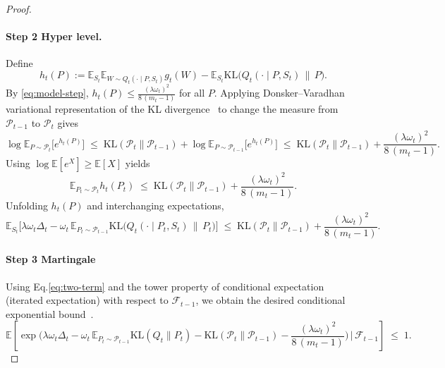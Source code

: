 \documentclass{article}
\theoremstyle{plain}
\theoremstyle{definition}
\theoremstyle{remark}
\begin{document}
\begin{proof}
\paragraph{Step 2 Hyper level.} 
Define
\[
h_t(P):=\mathbb E_{S_t}\mathbb E_{W\sim Q_t(\cdot\mid P,S_t)} g_t(W)
-\mathbb E_{S_t}\mathrm{KL}\!\big(Q_t(\cdot\mid P,S_t)\,\|\,P\big).
\]
By \eqref{eq:model-step}, $h_t(P)\le \frac{(\lambda\omega_t)^2}{8\,(m_t-1)}$ for all $P$.
Applying Donsker–Varadhan variational representation of the KL divergence~\cite{NEURIPS2021_54a367d6} to change the measure from $\mathcal P_{t-1}$ to $\mathcal P_t$ gives
\begin{equation}
\label{eq:dv-p}
\log\mathbb E_{P\sim\mathcal P_t}\!\big[e^{h_t(P)}\big]
\;\le\; \mathrm{KL}(\mathcal P_t\|\mathcal P_{t-1})
+\log\mathbb E_{P\sim\mathcal P_{t-1}}\!\big[e^{h_t(P)}\big]
\;\le\; \mathrm{KL}(\mathcal P_t\|\mathcal P_{t-1})
+\frac{(\lambda\omega_t)^2}{8\,(m_t-1)}.
\end{equation}
Using $\log\mathbb E[e^X]\ge \mathbb E[X]$ yields
\begin{equation}
\label{eq:p-expect}
\mathbb E_{P_t\sim\mathcal P_t} h_t(P_t)
\;\le\; \mathrm{KL}(\mathcal P_t\|\mathcal P_{t-1})
+\frac{(\lambda\omega_t)^2}{8\,(m_t-1)}.
\end{equation}
Unfolding $h_t(P)$ and interchanging expectations,
\begin{equation}
\label{eq:two-term}
\mathbb E_{S_t}\Big[
\lambda\omega_t\Delta_t
-\omega_t\,\mathbb E_{P_t\sim\mathcal P_{t-1}}\mathrm{KL}\!\big(Q_t(\cdot\mid P_t,S_t)\,\|\,P_t\big)
\Big]
\;\le\;
\mathrm{KL}(\mathcal P_t\|\mathcal P_{t-1})
+\frac{(\lambda\omega_t)^2}{8\,(m_t-1)}.
\end{equation}

\paragraph{Step 3 Martingale}







Using Eq.\eqref{eq:two-term} and the tower property of conditional expectation (iterated expectation) with respect to $\mathcal F_{t-1}$, we obtain the desired conditional exponential bound~\cite{yangshuxue}.
\begin{equation}
\label{eq:cond-mgf}
\mathbb E\!\left[
\exp\!\Big(
\lambda\omega_t\Delta_t
-\omega_t\,\mathbb E_{P_t\sim\mathcal P_{t-1}}\mathrm{KL}(Q_t\|P_t)
-\mathrm{KL}(\mathcal P_t\|\mathcal P_{t-1})
-\frac{(\lambda\omega_t)^2}{8\,(m_t-1)}
\Big)\,\Big|\,\mathcal F_{t-1}\right]\;\le\;1.
\end{equation}



\end{proof}
\end{document}
